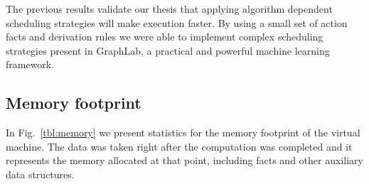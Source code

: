 The previous results validate our thesis that applying algorithm dependent scheduling strategies will make execution faster. By using a small set
of action facts and derivation rules we were able to implement complex scheduling strategies present in GraphLab, a practical and powerful machine learning
framework.

\subsection{Memory footprint}

In Fig.~\ref{tbl:memory} we present statistics for the memory footprint of the virtual machine. The data was taken right after the computation was completed
and it represents the memory allocated at that point, including facts and other auxiliary data structures.

\begin{table}[ht]
\begin{center}
\end{center}
     \caption{Memory usage of programs.}
     \label{tbl:memory}
\end{table}

